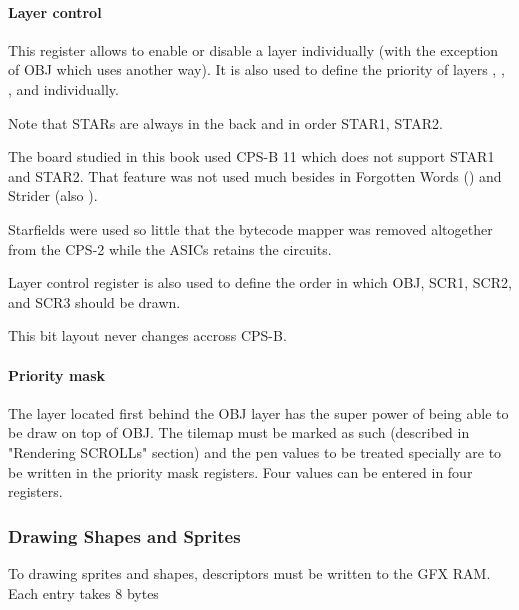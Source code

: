 \paragraph{Layer control} This register allows to enable or disable a layer individually (with the exception of OBJ which uses another way). It is also used to define the priority of layers , , , and  individually.

Note that STARs are always in the back and in order STAR1, STAR2.
\pagebreak

 

The board studied in this book used CPS-B 11 which does not support STAR1 and STAR2. That feature was not used much besides in Forgotten Words () and Strider (also ).

\begin{trivia}
Starfields were used so little that the bytecode mapper was removed altogether from the CPS-2 while the ASICs retains the circuits.
\end{trivia}

Layer control register is also used to define the order in which OBJ, SCR1, SCR2, and SCR3 should be drawn.

 

This bit layout never changes accross CPS-B.

\paragraph{Priority mask}
The layer located first behind the OBJ layer has the super power of being able to be draw on top of OBJ. The tilemap must be marked as such (described in "Rendering SCROLLs" section) and the pen values to be treated specially are to be written in the priority mask registers. Four values can be entered in four registers.



 






\subsubsection{Drawing Shapes and Sprites}
To drawing sprites and shapes, descriptors must be written to the GFX RAM. Each entry takes 8 bytes

